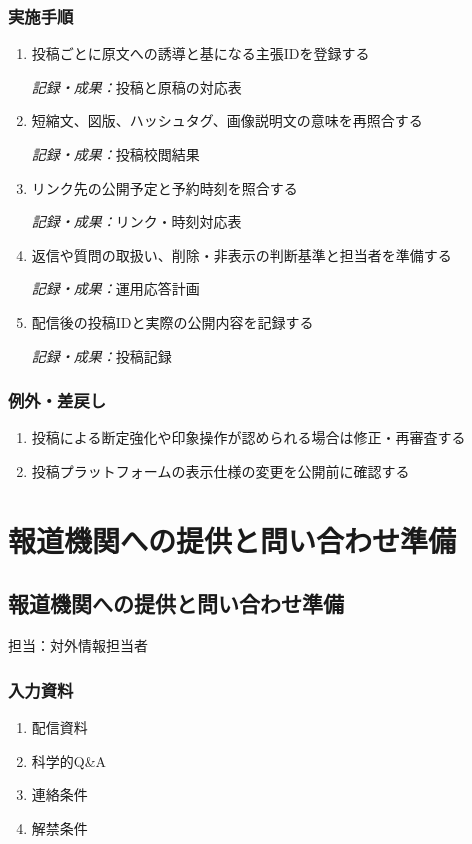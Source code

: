 \documentclass[a4paper,11pt]{article}
\begin{document}
\subsubsection*{実施手順}
\begin{enumerate}[leftmargin=2em,itemsep=0.65em]
\item 投稿ごとに原文への誘導と基になる主張IDを登録する\par\noindent\textit{記録・成果：}投稿と原稿の対応表\nobreak\smallskip
\item 短縮文、図版、ハッシュタグ、画像説明文の意味を再照合する\par\noindent\textit{記録・成果：}投稿校閲結果\nobreak\smallskip
\item リンク先の公開予定と予約時刻を照合する\par\noindent\textit{記録・成果：}リンク・時刻対応表\nobreak\smallskip
\item 返信や質問の取扱い、削除・非表示の判断基準と担当者を準備する\par\noindent\textit{記録・成果：}運用応答計画\nobreak\smallskip
\item 配信後の投稿IDと実際の公開内容を記録する\par\noindent\textit{記録・成果：}投稿記録\nobreak\smallskip
\end{enumerate}
\subsubsection*{例外・差戻し}
\begin{enumerate}[leftmargin=2em,itemsep=0.35em]
\item 投稿による断定強化や印象操作が認められる場合は修正・再審査する
\item 投稿プラットフォームの表示仕様の変更を公開前に確認する
\end{enumerate}
\section{報道機関への提供と問い合わせ準備}
\subsection{報道機関への提供と問い合わせ準備}
\par 担当：対外情報担当者\par\medskip
\subsubsection*{入力資料}
\begin{enumerate}[leftmargin=2em,itemsep=0.35em]
\item 配信資料
\item 科学的Q\&A
\item 連絡条件
\item 解禁条件
\end{enumerate}
\end{document}
